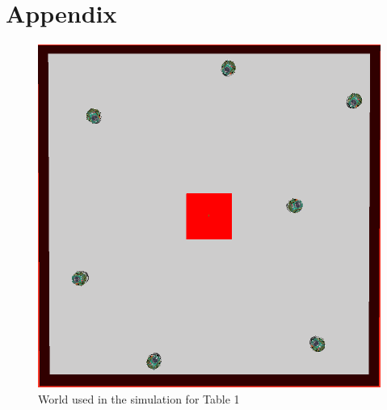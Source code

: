 \documentclass[a4paper]{article}
\begin{document}
\part{Appendix}
\begin{figure}[H]
\centering
\includegraphics[scale=0.5]{one-box-world.png}
\caption{World used in the simulation for Table 1}
\end{figure}





\nocite{*}
\end{document}
